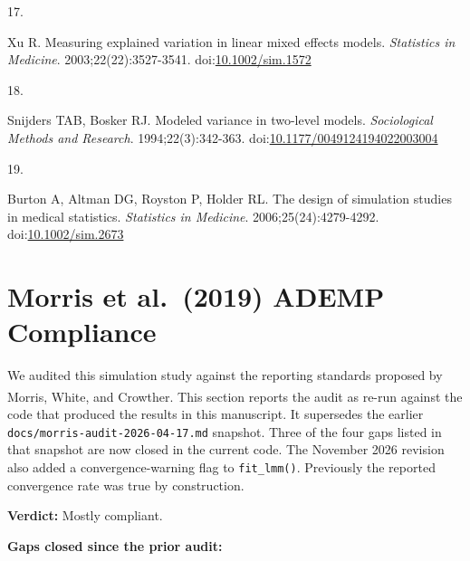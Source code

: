 \documentclass[
  11pt,
]{article}
\newlength{\cslhangindent}
\newlength{\csllabelwidth}
\newenvironment{CSLReferences}[2] %
 {\begin{list}{}{%
  \setlength{\itemindent}{0pt}
  \setlength{\leftmargin}{0pt}
  \setlength{\parsep}{0pt}
  \ifodd #1
   \setlength{\leftmargin}{\cslhangindent}
   \setlength{\itemindent}{-1\cslhangindent}
  \fi
  \setlength{\itemsep}{#2\baselineskip}}}
 {\end{list}}
\newcommand{\CSLLeftMargin}[1]{\parbox[t]{\csllabelwidth}{\strut#1\strut}}
\newcommand{\CSLRightInline}[1]{\parbox[t]{\linewidth - \csllabelwidth}{\strut#1\strut}}
\begin{document}
\begin{CSLReferences}{0}{1}
\CSLLeftMargin{17. }%
\CSLRightInline{Xu R. Measuring explained variation in linear mixed effects models. \emph{Statistics in Medicine}. 2003;22(22):3527-3541. doi:\href{https://doi.org/10.1002/sim.1572}{10.1002/sim.1572}}

\CSLLeftMargin{18. }%
\CSLRightInline{Snijders TAB, Bosker RJ. Modeled variance in two-level models. \emph{Sociological Methods and Research}. 1994;22(3):342-363. doi:\href{https://doi.org/10.1177/0049124194022003004}{10.1177/0049124194022003004}}

\CSLLeftMargin{19. }%
\CSLRightInline{Burton A, Altman DG, Royston P, Holder RL. The design of simulation studies in medical statistics. \emph{Statistics in Medicine}. 2006;25(24):4279-4292. doi:\href{https://doi.org/10.1002/sim.2673}{10.1002/sim.2673}}

\end{CSLReferences}

\appendix


\section{Morris et al.~(2019) ADEMP Compliance}\label{morris-et-al.-2019-ademp-compliance}

We audited this simulation study against the reporting standards
proposed by Morris, White, and Crowther\textsuperscript{}. This section reports the
audit as re-run against the code that produced the results in
this manuscript. It supersedes the earlier
\texttt{docs/morris-audit-2026-04-17.md} snapshot. Three of the four gaps
listed in that snapshot are now closed in the current code. The
November 2026 revision also added a convergence-warning flag to
\texttt{fit\_lmm()}. Previously the reported convergence rate was true by
construction.

\textbf{Verdict:} Mostly compliant.

\textbf{Gaps closed since the prior audit:}
\end{document}
